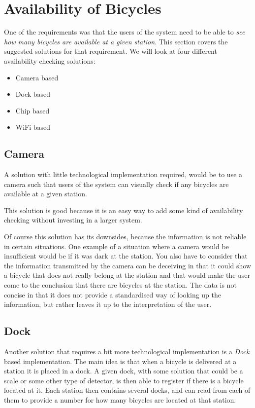 \section{Availability of Bicycles}\label{sec:availability}
One of the requirements was that the users of the system need to be able to \textit{see how many bicycles are available at a given station}.
This section covers the suggested solutions for that requirement.
We will look at four different availability checking solutions:

\begin{itemize}
\item Camera based
\item Dock based
\item Chip based
\item WiFi based
\end{itemize} 

\subsection{Camera}
A solution with little technological implementation required, would be to use a camera such that users of the system can visually check if any bicycles are available at a given station. 

This solution is good because it is an easy way to add some kind of availability checking without investing in a larger system.

Of course this solution has its downsides, because the information is not reliable in certain situations. 
One example of a situation where a camera would be insufficient would be if it was dark at the station.
You also have to consider that the information transmitted by the camera can be deceiving in that it could show a bicycle that does not really belong at the station and that would make the user come to the conclusion that there are bicycles at the station.
The data is not concise in that it does not provide a standardised way of looking up the information, but rather leaves it up to the interpretation of the user.

\subsection{Dock}
Another solution that requires a bit more technological implementation is a \textit{Dock} based implementation.
The main idea is that when a bicycle is delivered at a station it is placed in a dock.
A given dock, with some solution that could be a scale or some other type of detector, is then able to register if there is a bicycle located at it.
Each station then contains several docks, and can read from each of them to provide a number for how many bicycles are located at that station. 

